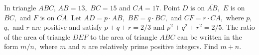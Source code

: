 In triangle $ABC$, $AB=13,$ $BC=15$ and $CA=17.$  Point $D$ is on $\overline{AB},$ $E$ is on $\overline{BC},$ and $F$ is on $\overline{CA}.$  Let $AD=p\cdot AB,$ $BE=q\cdot BC,$ and $CF=r\cdot CA,$ where $p,$ $q,$ and $r$ are positive and satisfy $p+q+r=2/3$ and $p^2+q^2+r^2=2/5.$  The ratio of the area of triangle $DEF$ to the area of triangle $ABC$ can be written in the form $m/n,$ where $m$ and $n$ are relatively prime positive integers.  Find $m+n.$